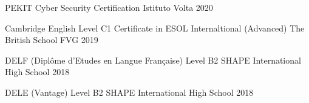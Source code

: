 


\begin{cvhonors}

  \cvhonor
    {PEKIT Cyber Security Certification} %
    {Istituto Volta} %
    {} %
    {2020} %


  \cvhonor
    {Cambridge English Level C1 Certificate in ESOL Internaltional (Advanced)} %
    {The British School FVG} %
    {} %
    {2019} %


  \cvhonor
    {DELF (Diplôme d’Etudes en Langue Française)  Level B2} %
    {SHAPE International High School} %
    {} %
    {2018} %


  \cvhonor
    {DELE (Vantage) Level B2} %
    {SHAPE International High School} %
    {} %
    {2018} %

\end{cvhonors}
